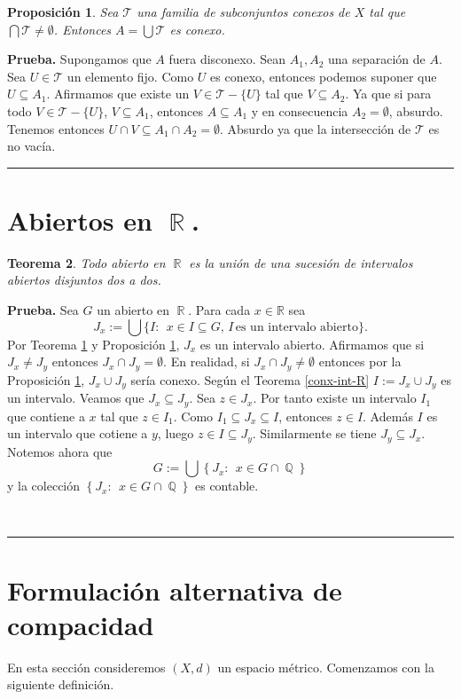 \documentclass[x11names, 12pt]{book}
\newtheorem{teorema}{Teorema}
\newtheorem{proposition}[teorema]{Proposición}
\newenvironment{prueba}[1][Prueba]{\noindent\textbf{#1.} }{\ \rule{0.5em}{0.5em}}
\DeclareMathOperator{\Q}{\mathbb{Q}}
\DeclareMathOperator{\R}{\mathbb{R}}
\begin{document}
\begin{proposition}\label{inte-conex-R}
Sea $\mathcal{T}$ una familia de subconjuntos conexos de $X$ tal que $\bigcap \mathcal{T} \neq \emptyset$. Entonces $A=\bigcup \mathcal{T} $ es conexo.
\end{proposition}
 \begin{prueba}
 Supongamos que $A$ fuera disconexo. Sean $A_1, A_2$ una separación de $A$. Sea $U\in \mathcal{T}$ un elemento fijo. Como $U$ es conexo, entonces podemos suponer que $U\subseteq A_1$. Afirmamos que existe un $V\in \mathcal{T}-\{U\}$ tal que $V\subseteq A_2$. Ya que si para todo  $V\in \mathcal{T}-\{U\}$, $V \subseteq A_1$, entonces $A \subseteq A_1$ y en consecuencia $A_2 = \emptyset$, absurdo. Tenemos entonces $U\cap V \subseteq A_1 \cap A_2=\emptyset$.  Absurdo ya que la intersección de $\mathcal{T}$ es no vacía.
 \end{prueba}



\section{Abiertos en $\R$.}
\begin{teorema}
Todo abierto en $\R$ es la unión de una sucesión de intervalos abiertos disjuntos dos a dos.
\end{teorema}
\begin{prueba}
Sea $G$ un abierto en $\R$. Para cada $x \in \mathbb{R}$ sea \[ J_x:=\bigcup \{I: \ \ x\in I \subseteq G, \, I \, \text{es un intervalo abierto} \}.\]
Por Teorema \ref{inte-conex-R} y Proposición \ref{inte-conex-R}, $J_x$ es un intervalo abierto. Afirmamos que si $J_x \neq J_y$ entonces $J_x \cap J_y=\emptyset.$ En realidad, si $J_x \cap J_y \neq \emptyset $ entonces por la Proposición \ref{inte-conex-R}, $J_x \cup J_y$ sería conexo. Según el Teorema \ref{conx-int-R} $I:=J_x \cup J_y$ es un intervalo. Veamos que $J_x \subseteq J_y$. Sea $z\in J_x$. Por tanto existe un intervalo $I_1$ que contiene a $x$ tal que $z\in I_1$. Como $I_1 \subseteq J_x \subseteq I$, entonces $z\in I$. Además $I$ es un intervalo que cotiene a $y$, luego $z\in I \subseteq J_y$. Similarmente se tiene $J_y \subseteq J_x$. Notemos ahora que \[G:=\bigcup \left\{J_x: \ \ x\in G \cap \Q  \right\}\]
y la colección $\left\{J_x: \ \ x\in G \cap \Q \right\}$ es contable.

\end{prueba}

\section{Formulación alternativa de compacidad}
En esta sección consideremos $(X,d) $ un espacio métrico. Comenzamos con la siguiente definición.
\end{document}
